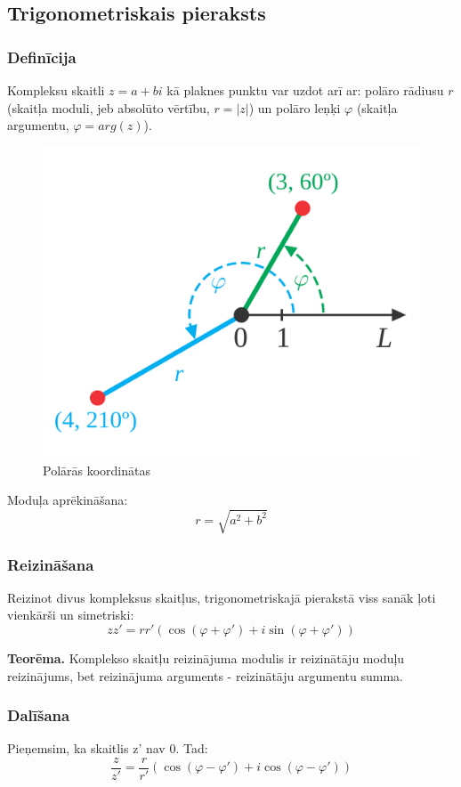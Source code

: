 \documentclass{article}
\begin{document}
\subsection{Trigonometriskais pieraksts}

\subsubsection{Definīcija}

Kompleksu skaitli $z =a+bi$ kā plaknes punktu var uzdot arī ar: polāro rādiusu $r$ (skaitļa moduli, jeb absolūto vērtību, $r=|z|$) un polāro leņķi $\varphi$ (skaitļa argumentu, $\varphi=arg(z)$).
\begin{figure}[!htb]
	\centering
	\caption{Polārās koordinātas}
	\includegraphics[width=0.3\linewidth]{polar_coordinates-1}
\end{figure}

Moduļa aprēkināšana:
\begin{equation}
	r=\sqrt{a^2+b^2}
\end{equation}

\subsubsection{Reizināšana}

Reizinot divus kompleksus skaitļus, trigonometriskajā pierakstā
viss sanāk ļoti vienkārši un simetriski:
\begin{equation}
	zz'=rr'(\cos(\varphi+\varphi')+i\sin(\varphi+\varphi'))
\end{equation}

\textbf{Teorēma.} Komplekso skaitļu reizinājuma modulis ir reizinātāju moduļu reizinājums, bet reizinājuma arguments - reizinātāju argumentu summa.

\subsubsection{Dalīšana}

Pieņemsim, ka skaitlis z' nav 0. Tad:
\begin{equation}
	\frac{z}{z'}=\frac{r}{r'}(\cos(\varphi-\varphi')+i\cos(\varphi-\varphi'))
\end{equation}
\end{document}

